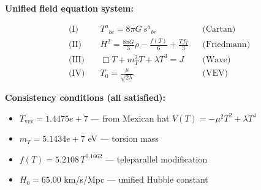 
\textbf{Unified field equation system:}

\begin{align}
  \text{(I)} \quad & T^a{}_{bc} = 8\pi G \, s^a{}_{bc} && \text{(Cartan)} \\
  \text{(II)} \quad & H^2 = \frac{8\pi G}{3}\rho - \frac{f(T)}{6} + \frac{Tf_T}{3} && \text{(Friedmann)} \\
  \text{(III)} \quad & \Box T + m_T^2 T + \lambda T^3 = J && \text{(Wave)} \\
  \text{(IV)} \quad & T_0 = \frac{\mu}{\sqrt{2\lambda}} && \text{(VEV)}
\end{align}

\textbf{Consistency conditions (all satisfied):}
\begin{itemize}
  \item $T_{\text{vev}} = 1.4475e+7$ — from Mexican hat $V(T) = -\mu^2 T^2 + \lambda T^4$
  \item $m_T = 5.1434e+7$ eV — torsion mass
  \item $f(T) = 5.2108 \, T^{0.1662}$ — teleparallel modification
  \item $H_0 = 65.00$ km/s/Mpc — unified Hubble constant
\end{itemize}